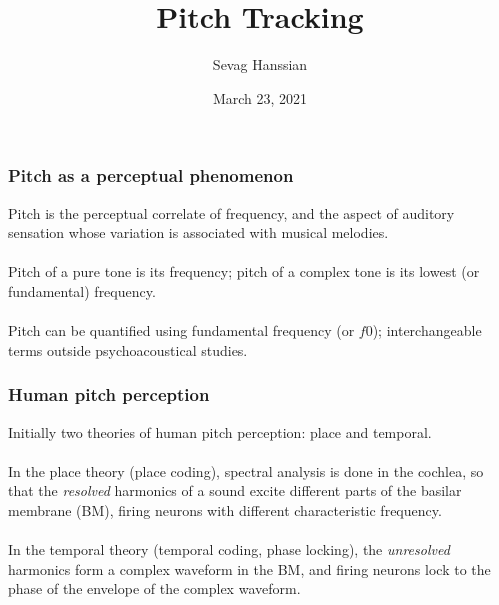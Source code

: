 \documentclass{beamer}
\title{Pitch Tracking}
\author{Sevag Hanssian}
\date{March 23, 2021}
\institute{MUMT 621, Winter 2021}
\begin{document}
\begin{frame}
\maketitle
\end{frame}

\begin{frame}
	\frametitle{Pitch as a perceptual phenomenon}
	Pitch is the perceptual correlate of frequency, and the aspect of auditory sensation whose variation is associated with musical melodies.\\\ \\
	Pitch of a pure tone is its frequency; pitch of a complex tone is its lowest (or fundamental) frequency.\\\ \\
	Pitch can be quantified using fundamental frequency (or $\mathit{f0}$); interchangeable terms outside psychoacoustical studies.
\end{frame}


\begin{frame}
	\frametitle{Human pitch perception}
Initially two theories of human pitch perception: place and temporal.\\\ \\
	In the place theory (place coding), spectral analysis is done in the cochlea, so that the \textit{resolved} harmonics of a sound excite different parts of the basilar membrane (BM), firing neurons with different characteristic frequency.\\\ \\
	In the temporal theory (temporal coding, phase locking), the \textit{unresolved} harmonics form a complex waveform in the BM, and firing neurons lock to the phase of the envelope of the complex waveform.
\end{frame}
\end{document}
